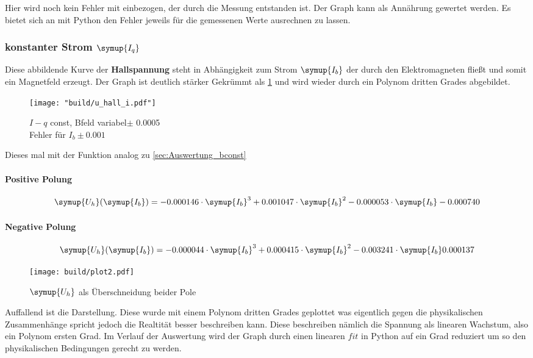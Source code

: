 Hier wird noch kein Fehler mit einbezogen, der durch die Messung entstanden ist. Der Graph kann als Annährung gewertet werden. 
Es bietet sich an mit Python den Fehler jeweils für die gemessenen Werte ausrechnen zu lassen.


\subsubsection{konstanter Strom $\symup{I_q}$}
\label{sec:Auswertung_iconst}

Diese abbildende  Kurve der \textbf{Hallspannung} steht in Abhängigkeit zum Strom $\symup{I_b}$ der durch den Elektromagneten fließt und somit ein Magnetfeld erzeugt.
Der Graph ist deutlich stärker Gekrümmt als \ref{fig:Uhall} und wird wieder durch ein Polynom dritten Grades abgebildet. 


\begin{figure}
   \centering
    \texttt{[image: "build/u\_hall\_i.pdf"]}
    \caption{$I-q$ const, Bfeld variabel$\pm$ 0.0005\\Fehler für $I_b \pm 0.001$}
    \label{fig:Uhall}
 \end{figure}



Dieses mal mit der Funktion analog zu \ref{sec:Auswertung_bconst}
\paragraph{Positive Polung}


\begin{equation}
   \symup{U_h}(\symup{I_b})=-0.000146 \cdot \symup{I_b}^3 + 0.001047\cdot\symup{I_b}^2 -0.000053\cdot\symup{I_b} -0.000740
\end{equation}

\paragraph{Negative Polung}

\begin{equation}
   \symup{U_h}(\symup{I_b})=-0.000044 \cdot \symup{I_b}^3 + 0.000415\cdot\symup{I_b}^2 -0.003241\cdot\symup{I_b} 0.000137
\end{equation}

\begin{figure}[!h]
   \centering
   \texttt{[image: build/plot2.pdf]} %
   \caption{$\symup{U_h}$ als Überschneidung beider Pole}
   \label{fig:auswertunghall}
\end{figure}

Auffallend ist die Darstellung. Diese wurde mit einem Polynom dritten Grades geplottet was eigentlich gegen die physikalischen Zusammenhänge
spricht jedoch die Realtität besser beschreiben kann. Diese beschreiben nämlich die Spannung als linearen Wachstum, also ein Polynom ersten Grad. Im Verlauf der Auswertung wird der Graph durch einen linearen $fit$
in Python auf ein Grad reduziert um so den physikalischen Bedingungen gerecht zu werden.



%
